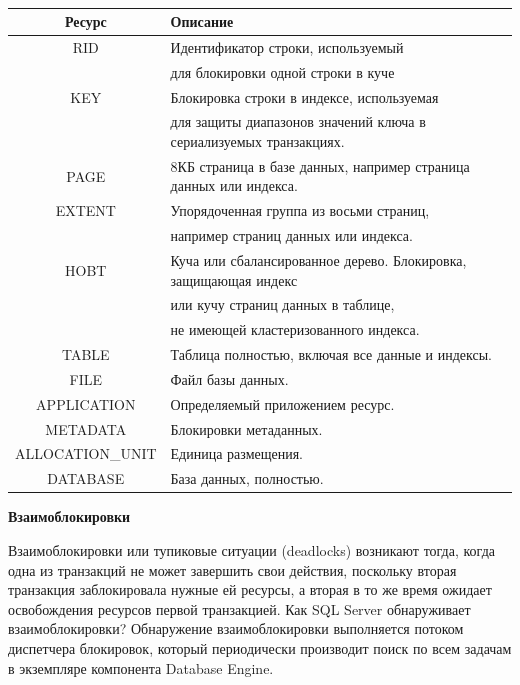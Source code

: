 \begin{table}[ht!]
	\begin{center}
		\caption{}
		\label{tbl:gran}
		\begin{tabular}{|c|l|}
			\hline
			\textbf{Ресурс} & \textbf{Описание} \\
			\hline
			RID & Идентификатор строки, используемый \\ & для блокировки одной строки в куче \\
			\hline
			KEY & Блокировка строки в индексе, используемая \\ & для защиты диапазонов значений ключа в
			сериализуемых транзакциях. \\
			\hline
			PAGE & 8КБ страница в базе данных, например страница данных или индекса. \\
			\hline
			EXTENT & Упорядоченная группа из восьми страниц, \\ & например страниц данных или индекса. \\
			\hline
			HOBT & Куча или сбалансированное дерево. Блокировка, защищающая индекс \\ & или кучу страниц
			данных в таблице, \\ & не имеющей кластеризованного индекса. \\
			\hline
			TABLE & Таблица полностью, включая все данные и индексы. \\
			\hline
			FILE & Файл базы данных. \\
			\hline
			APPLICATION & Определяемый приложением ресурс. \\
			\hline
			METADATA & Блокировки метаданных. \\
			\hline
			ALLOCATION\_UNIT & Единица размещения. \\
			\hline
			DATABASE & База данных, полностью. \\
			\hline
		\end{tabular}
	\end{center}
\end{table}
\FloatBarrier

\textbf{Взаимоблокировки}

Взаимоблокировки или тупиковые ситуации (deadlocks) возникают тогда, когда одна из транзакций не может завершить свои действия, поскольку вторая транзакция заблокировала нужные ей ресурсы, а вторая в то же время ожидает освобождения ресурсов первой транзакцией. Как SQL Server обнаруживает взаимоблокировки? Обнаружение взаимоблокировки выполняется потоком диспетчера блокировок, который периодически производит поиск по всем задачам в экземпляре компонента Database Engine.


